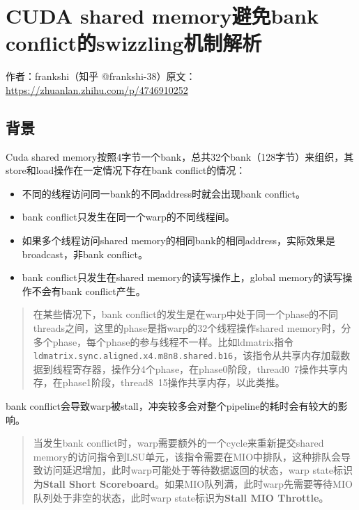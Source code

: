 \chapter{CUDA shared memory避免bank conflict的swizzling机制解析}

\begin{center}\small 作者：frankshi（知乎 @frankshi-38）\quad 原文：\url{https://zhuanlan.zhihu.com/p/4746910252}\end{center}

\section{背景}

Cuda shared memory按照4字节一个bank，总共32个bank（128字节）来组织，其store和load操作在一定情况下存在bank conflict的情况：

\begin{itemize}
  \item 不同的线程访问同一bank的不同address时就会出现bank conflict。
  \item bank conflict只发生在同一个warp的不同线程间。
  \item 如果多个线程访问shared memory的相同bank的相同address，实际效果是broadcast，非bank conflict。
  \item bank conflict只发生在shared memory的读写操作上，global memory的读写操作不会有bank conflict产生。
\end{itemize}

\begin{quote}
在某些情况下，bank conflict的发生是在warp中处于同一个phase的不同threads之间，这里的phase是指warp的32个线程操作shared memory时，分多个phase，每个phase的参与线程不一样。比如ldmatrix指令\lstinline|ldmatrix.sync.aligned.x4.m8n8.shared.b16|，该指令从共享内存加载数据到线程寄存器，操作分4个phase，在phase0阶段，thread0~7操作共享内存，在phase1阶段，thread8~15操作共享内存，以此类推。
\end{quote}

bank conflict会导致warp被stall，冲突较多会对整个pipeline的耗时会有较大的影响。

\begin{quote}
当发生bank conflict时，warp需要额外的一个cycle来重新提交shared memory的访问指令到LSU单元，该指令需要在MIO中排队，这种排队会导致访问延迟增加，此时warp可能处于等待数据返回的状态，warp state标识为\textbf{Stall Short Scoreboard}。如果MIO队列满，此时warp先需要等待MIO队列处于非空的状态，此时warp state标识为\textbf{Stall MIO Throttle}。
\end{quote}

